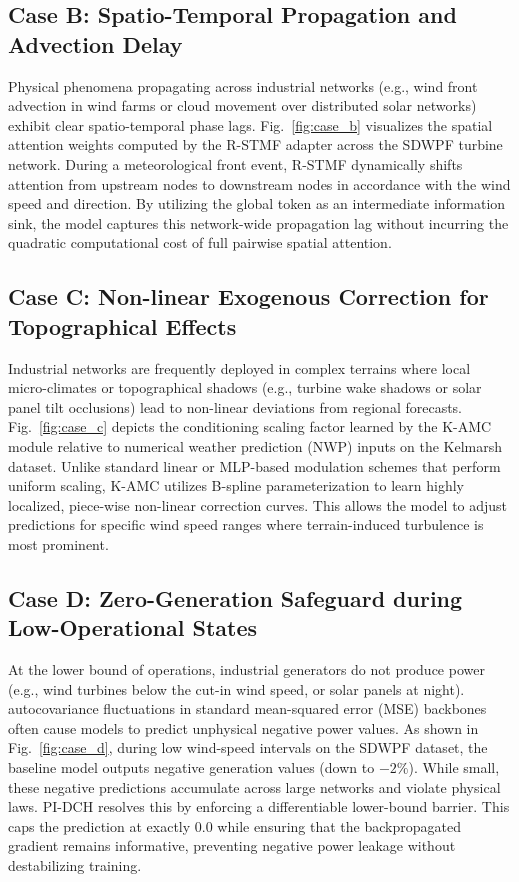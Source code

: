\subsection{Case B: Spatio-Temporal Propagation and Advection Delay}
Physical phenomena propagating across industrial networks (e.g., wind front advection in wind farms or cloud movement over distributed solar networks) exhibit clear spatio-temporal phase lags.
Fig.~\ref{fig:case_b} visualizes the spatial attention weights computed by the R-STMF adapter across the SDWPF turbine network. During a meteorological front event, R-STMF dynamically shifts attention from upstream nodes to downstream nodes in accordance with the wind speed and direction. By utilizing the global token as an intermediate information sink, the model captures this network-wide propagation lag without incurring the quadratic computational cost of full pairwise spatial attention.

\subsection{Case C: Non-linear Exogenous Correction for Topographical Effects}
Industrial networks are frequently deployed in complex terrains where local micro-climates or topographical shadows (e.g., turbine wake shadows or solar panel tilt occlusions) lead to non-linear deviations from regional forecasts.
Fig.~\ref{fig:case_c} depicts the conditioning scaling factor learned by the K-AMC module relative to numerical weather prediction (NWP) inputs on the Kelmarsh dataset. Unlike standard linear or MLP-based modulation schemes that perform uniform scaling, K-AMC utilizes B-spline parameterization to learn highly localized, piece-wise non-linear correction curves. This allows the model to adjust predictions for specific wind speed ranges where terrain-induced turbulence is most prominent.

\subsection{Case D: Zero-Generation Safeguard during Low-Operational States}
At the lower bound of operations, industrial generators do not produce power (e.g., wind turbines below the cut-in wind speed, or solar panels at night). autocovariance fluctuations in standard mean-squared error (MSE) backbones often cause models to predict unphysical negative power values.
As shown in Fig.~\ref{fig:case_d}, during low wind-speed intervals on the SDWPF dataset, the baseline model outputs negative generation values (down to $-2\%$). While small, these negative predictions accumulate across large networks and violate physical laws. PI-DCH resolves this by enforcing a differentiable lower-bound barrier. This caps the prediction at exactly $0.0$ while ensuring that the backpropagated gradient remains informative, preventing negative power leakage without destabilizing training.